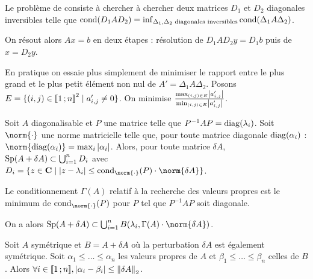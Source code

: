 	\begin{defn}
		Le problème de  consiste à chercher à chercher deux matrices $D_1$ et $D_2$ diagonales inversibles telle que $\operatorname{cond}(D_1 A D_2) = \inf_{\Delta_1, \Delta_2 \text{ diagonales inversibles}} \operatorname{cond}(\Delta_1 A \Delta_2)$.
	\end{defn}

	On résout alors $Ax = b$ en deux étapes : résolution de $D_1 A D_2 y = D_1 b$ puis de $x = D_2 y$.

	En pratique on essaie plus simplement de minimiser le rapport entre le plus grand et le plus petit élément non nul de $A' = \Delta_1 A \Delta_2$.
	Posons $E = \{ (i,j) \in \mathopen{[\![}1\mathclose{}\mathpunct{};n\mathclose{]\!]}^2 \mid a'_{i,j} \neq 0 \}$.
	On minimise $\frac{ \max_{(i,j) \in E} \left\lvert a'_{i,j}\right\rvert }{ \min_{(i,j) \in E} \left\lvert a'_{i,j}\right\rvert }$.


	\begin{thm}
		Soit $A$ diagonalisable et $P$ une matrice telle que $P^{-1} A P = \operatorname{diag}(\lambda_i)$.
		Soit $\norm{\cdot}$ une norme matricielle telle que, pour toute matrice diagonale $\operatorname{diag}(\alpha_i)$ : $\norm{\diag(\alpha_i)} = \max_i \abs{\alpha_i}$.
		Alors, pour toute matrice $\delta A$, $\operatorname{Sp}(A + \delta A) \subset \bigcup_{i = 1}^n D_i$ avec $D_i = \{ z \in \C \mid \abs{z - \lambda_i} \leq \cond_{\norm{\cdot}}(P) \cdot \norm{\delta A} \}$.
	\end{thm}
	
	\begin{defn}
		Le conditionnement $\Gamma(A)$ relatif à la recherche des valeurs propres est le minimum de $\cond_{\norm{\cdot}}(P)$ pour $P$ tel que $P^{-1} A P$ soit diagonale.
	\end{defn}

	On a alors $\Sp(A + \delta A) \subset \bigcup_{i = 1}^n B(\lambda_i, \Gamma(A) \cdot \norm{\delta A})$.
	
	\begin{thm}
		Soit $A$ symétrique et $B = A + \delta A$ où la perturbation $\delta A$ est également symétrique.
		Soit $\alpha_1 \leq \ldots \leq \alpha_n$ les valeurs propres de $A$ et $\beta_1 \leq \ldots \leq \beta_n$ celles de $B$.
		Alors $\forall i \in \mathopen{[\![}1\mathclose{}\mathpunct{};n\mathclose{]\!]}, \left\lvert\alpha_i - \beta_i\right\rvert \leq \left\lVert\delta A\right\rVert_2$.
	\end{thm}
